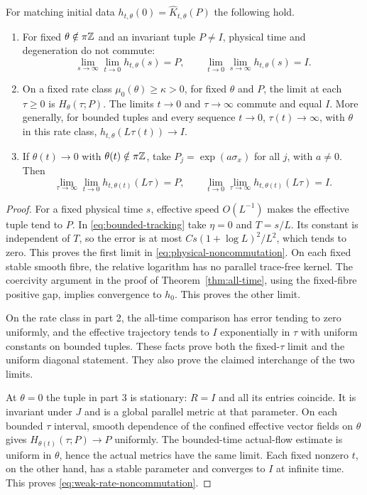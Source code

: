 \begin{proposition}\label{prop:time-limits}
For matching initial data
$h_{t,\theta}(0)=\widehat K_{t,\theta}(P)$ the following hold.
\begin{enumerate}
\item For fixed $\theta\notin\pi\mathbb Z$ and an invariant tuple
$P\ne I$, physical time and degeneration do not commute:
\begin{equation}\label{eq:physical-noncommutation}
 \lim_{s\to\infty}\lim_{t\to0}h_{t,\theta}(s)=P,
 \qquad
 \lim_{t\to0}\lim_{s\to\infty}h_{t,\theta}(s)=I.
\end{equation}
\item On a fixed rate class $\mu_0(\theta)\ge\kappa>0$, for
fixed $\theta$ and $P$, the limit at each $\tau\ge0$ is
$H_\theta(\tau;P)$. The limits $t\to0$ and $\tau\to\infty$
commute and equal $I$. More generally, for bounded tuples and every
sequence $t\to0$, $\tau(t)\to\infty$, with $\theta$ in this
rate class, $h_{t,\theta}(L\tau(t))\to I$.
\item If $\theta(t)\to0$ with $\theta(t)\notin\pi\mathbb Z$, take
$P_j=\exp(a\sigma_x)$ for all $j$, with $a\ne0$. Then
\begin{equation}\label{eq:weak-rate-noncommutation}
 \lim_{\tau\to\infty}\lim_{t\to0}
       h_{t,\theta(t)}(L\tau)=P,
 \qquad
 \lim_{t\to0}\lim_{\tau\to\infty}
       h_{t,\theta(t)}(L\tau)=I.
\end{equation}
\end{enumerate}
\end{proposition}

\begin{proof}
For a fixed physical time $s$, effective speed $O(L^{-1})$ makes the
effective tuple tend to $P$. In \eqref{eq:bounded-tracking} take
$\eta=0$ and $T=s/L$. Its constant is independent of $T$, so the
error is at most $Cs(1+\log L)^2/L^2$, which tends to zero.
This proves the first limit in \eqref{eq:physical-noncommutation}.
On each fixed stable smooth fibre, the relative logarithm has no
parallel trace-free kernel. The coercivity argument in the proof of
Theorem~\ref{thm:all-time}, using the fixed-fibre positive gap,
implies convergence to $h_0$. This proves the other limit.

On the rate class in part 2, the all-time comparison has error tending
to zero uniformly, and the effective trajectory tends to $I$
exponentially in $\tau$ with uniform constants on bounded tuples.
These facts prove both the fixed-$\tau$ limit and the uniform diagonal
statement. They also prove the claimed interchange of the two limits.

At $\theta=0$ the tuple in part 3 is stationary: $R=I$ and all
its entries coincide. It is invariant under $J$ and is a global
parallel metric at that parameter. On each bounded $\tau$ interval,
smooth dependence of the confined effective vector fields on $\theta$
gives $H_{\theta(t)}(\tau;P)\to P$ uniformly. The bounded-time
actual-flow estimate is uniform in $\theta$, hence the actual
metrics have the same limit. Each fixed nonzero $t$, on the other
hand, has a stable parameter and converges to $I$ at infinite time.
This proves \eqref{eq:weak-rate-noncommutation}.
\end{proof}

